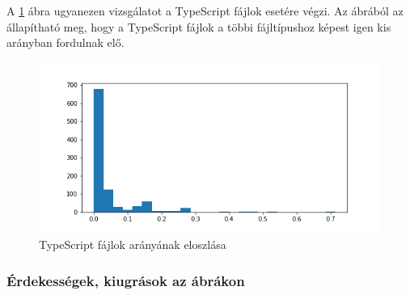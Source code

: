 \pagebreak

A \ref{fig:hist_4} ábra ugyanezen vizsgálatot a TypeScript fájlok esetére végzi. Az ábrából az állapítható meg, hogy a TypeScript fájlok a többi fájltípushoz képest igen kis arányban fordulnak elő.

\begin{figure}[!h]
	\centering
	\includegraphics[scale=0.7]{images/hist_4.png}
	\caption{TypeScript fájlok arányának eloszlása}
	\label{fig:hist_4}
\end{figure}

\subsubsection{Érdekességek, kiugrások az ábrákon}

